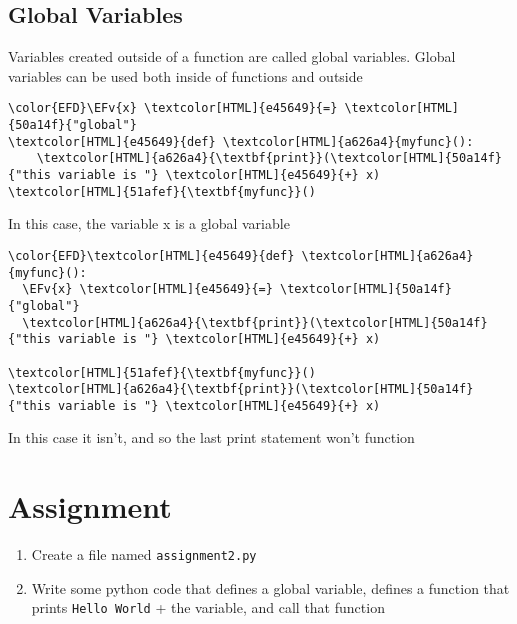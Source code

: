 \documentclass{scrartcl}
\newcommand{\EFv}[1]{\textcolor{EFv}{#1}} %
\begin{document}
\subsection{Global Variables}
\label{sec:orgd8407b1}
Variables created outside of a function are called global variables. Global
variables can be used both inside of functions and outside
\begin{Code}
\begin{Verbatim}[]
\color{EFD}\EFv{x} \textcolor[HTML]{e45649}{=} \textcolor[HTML]{50a14f}{"global"}
\textcolor[HTML]{e45649}{def} \textcolor[HTML]{a626a4}{myfunc}():
    \textcolor[HTML]{a626a4}{\textbf{print}}(\textcolor[HTML]{50a14f}{"this variable is "} \textcolor[HTML]{e45649}{+} x)
\textcolor[HTML]{51afef}{\textbf{myfunc}}()
\end{Verbatim}
\end{Code}
In this case, the variable x is a global variable
\begin{Code}
\begin{Verbatim}[]
\color{EFD}\textcolor[HTML]{e45649}{def} \textcolor[HTML]{a626a4}{myfunc}():
  \EFv{x} \textcolor[HTML]{e45649}{=} \textcolor[HTML]{50a14f}{"global"}
  \textcolor[HTML]{a626a4}{\textbf{print}}(\textcolor[HTML]{50a14f}{"this variable is "} \textcolor[HTML]{e45649}{+} x)

\textcolor[HTML]{51afef}{\textbf{myfunc}}()
\textcolor[HTML]{a626a4}{\textbf{print}}(\textcolor[HTML]{50a14f}{"this variable is "} \textcolor[HTML]{e45649}{+} x)
\end{Verbatim}
\end{Code}
In this case it isn't, and so the last print statement won't function

\section{Assignment}
\label{sec:org78aafc6}
\begin{enumerate}
\item Create a file named \texttt{assignment2.py}
\item Write some python code that defines a global variable, defines a function
that prints \texttt{Hello World} + the variable, and call that function
\end{enumerate}
\end{document}
